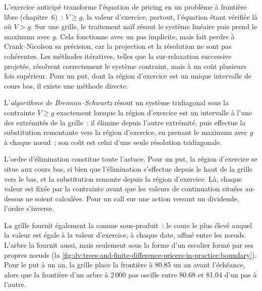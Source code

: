 L'exercice anticipé transforme l'équation de pricing en un problème à frontière libre (chapitre~6)~: $V\ge g$, la valeur d'exercice, partout, l'équation
étant vérifiée là où $V>g$. Sur une grille, le traitement naïf résout le système linéaire puis prend le maximum avec $g$. Cela fonctionne avec un pas
implicite, mais fait perdre à Crank--Nicolson sa précision, car la projection et la résolution ne sont pas cohérentes. Les méthodes itératives, telles que la sur-relaxation successive projetée,
résolvent correctement le système contraint, mais à un coût plusieurs fois supérieur. Pour un put, dont la région d'exercice est un unique intervalle
de cours bas, il existe une méthode directe.

\begin{definition}\label{def:dv:trees-and-finite-difference-pricers-in-practice:bs}
L'\emph{algorithme de Brennan--Schwartz} résout un système tridiagonal sous la contrainte $V\ge g$ exactement
lorsque la région d'exercice est un intervalle à l'une des extrémités de la grille~: il élimine depuis l'autre extrémité, puis effectue la substitution
remontante vers la région d'exercice, en prenant le maximum avec $g$ à chaque nœud~; son coût est celui d'une seule résolution tridiagonale.
\end{definition}

L'ordre d'élimination constitue toute l'astuce. Pour un put, la région d'exercice se situe aux cours bas, si bien que l'élimination s'effectue depuis le haut
de la grille vers le bas, et la substitution remonte depuis la région d'exercice. Là, chaque valeur est fixée par la contrainte avant que les valeurs de continuation
situées au-dessus ne soient calculées. Pour un call sur une action versant un dividende, l'ordre s'inverse.

La grille fournit également la  comme sous-produit~: le cours le plus élevé auquel la valeur est égale à la valeur d'exercice, à chaque date,
affiné entre les nœuds. L'arbre la fournit aussi, mais seulement sous la forme d'un escalier formé par ses propres nœuds
(la \cref{fig:dv:trees-and-finite-difference-pricers-in-practice:boundary}). Pour le put à un an, la grille place la frontière à 80.85 un an
avant l'échéance, alors que la frontière d'un arbre à 2\,000 pas oscille entre 80.68 et 81.04 d'un pas à l'autre.

